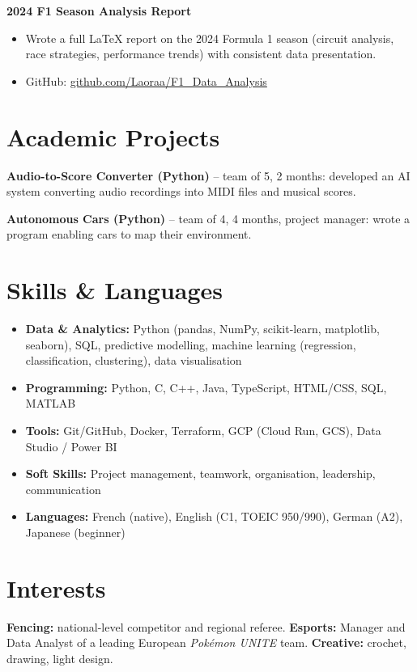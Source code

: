 \documentclass[10pt,a4paper]{article}
\newcommand{\entryone}[2]{%
  \textbf{#1} \hfill \textbf{#2}\par\vspace{-2pt}
}
\begin{document}
\vspace{2pt}
\entryone{2024 F1 Season Analysis Report}{}
\begin{itemize}
  \item Wrote a full \LaTeX{} report on the 2024 Formula 1 season (circuit analysis, race strategies, performance trends) with consistent data presentation.
  \item GitHub: \href{https://github.com/Laoraa/F1_Data_Analysis}{github.com/Laoraa/F1\_Data\_Analysis}
\end{itemize}

\section{Academic Projects}

\textbf{Audio-to-Score Converter (Python)} -- team of 5, 2 months: developed an AI system converting audio recordings into MIDI files and musical scores.

\vspace{2pt}
\textbf{Autonomous Cars (Python)} -- team of 4, 4 months, project manager: wrote a program enabling cars to map their environment.

\section{Skills \& Languages}
\begin{itemize}[label={}, leftmargin=0pt, itemsep=2pt]
  \item \textbf{Data \& Analytics:} Python (pandas, NumPy, scikit-learn, matplotlib, seaborn), SQL, predictive modelling, machine learning (regression, classification, clustering), data visualisation
  \item \textbf{Programming:} Python, C, C++, Java, TypeScript, HTML/CSS, SQL, MATLAB
  \item \textbf{Tools:} Git/GitHub, Docker, Terraform, GCP (Cloud Run, GCS), Data Studio / Power BI
  \item \textbf{Soft Skills:} Project management, teamwork, organisation, leadership, communication
  \item \textbf{Languages:} French (native), English (C1, TOEIC 950/990), German (A2), Japanese (beginner)
\end{itemize}

\section{Interests}
\textbf{Fencing:} national-level competitor and regional referee. \textbf{Esports:} Manager and Data Analyst of a leading European \textit{Pok\'emon UNITE} team. \textbf{Creative:} crochet, drawing, light design.
\end{document}
